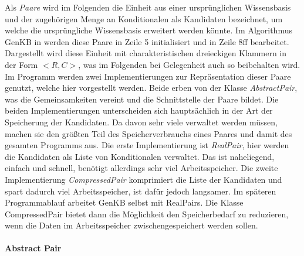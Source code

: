 \documentclass[12pt,a4paper]{article}
\begin{document}
Als \textit{Paare} wird im Folgenden die Einheit aus einer ursprünglichen Wissensbasis und der zugehörigen Menge an Konditionalen als Kandidaten bezeichnet, um welche die ursprüngliche Wissensbasis erweitert werden könnte. Im Algorithmus GenKB in \cite{beierle19} werden diese Paare in Zeile 5 initialisiert und in Zeile 8ff bearbeitet. Dargestellt wird diese Einheit mit charakteristischen dreieckigen Klammern in der Form $<R, C>$, was im Folgenden bei Gelegenheit auch so beibehalten wird. \\
Im Programm werden zwei Implementierungen zur Repräsentation dieser Paare genutzt, welche hier vorgestellt werden. Beide erben von der Klasse \textit{AbstractPair}, was die Gemeinsamkeiten vereint und die Schnittstelle der Paare bildet. Die beiden Implementierungen unterscheiden sich hauptsächlich in der Art der Speicherung der Kandidaten. Da davon sehr viele verwaltet werden müssen, machen sie den größten Teil des Speicherverbrauchs eines Paares und damit des gesamten Programms aus. Die erste Implementierung ist \textit{RealPair}, hier werden die Kandidaten als Liste von Konditionalen verwaltet. Das ist naheliegend, einfach und schnell, benötigt allerdings sehr viel Arbeitsspeicher. Die zweite Implementierung \textit{CompressedPair} komprimiert die Liste der Kandidaten und spart dadurch viel Arbeitsspeicher, ist dafür jedoch langsamer. Im späteren Programmablauf arbeitet GenKB selbst mit RealPairs. Die Klasse CompressedPair bietet dann die Möglichkeit den Speicherbedarf zu reduzieren, wenn die Daten im Arbeitsspeicher zwischengespeichert werden sollen.




\paragraph{Abstract Pair}\mbox{}
\label{sec:abstractpair}
\end{document}
